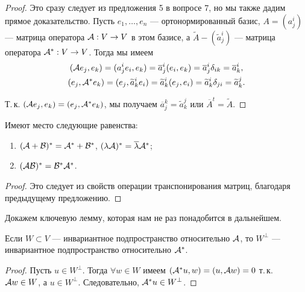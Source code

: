 \begin{proof}
    Это сразу следует из предложения 5 в вопросе 7, но мы также дадим прямое доказательство. Пусть $e_1, \ldots, e_n$ --- ортонормированный базис, $A = (a^i_j)$ --- матрица оператора $\mathcal{A}: V \to V$ в этом базисе, а $\widetilde{A} - (\widetilde{a}^i_j)$ --- матрица оператора $\mathcal{A}^\ast: V \to V$. Тогда мы имеем
    \begin{gather*}
        (\mathcal{A} e_j, e_k) = (a^i_je_i, e_k) = \overline{a}^i_j(e_i, e_k) = \overline{a}^i_j\delta_{ik} = \overline{a}^i_k,\\
        (e_j, \mathcal{A}^\ast e_k) = (e_j, \widetilde{a}^i_ke_i) = \widetilde{a}^i_k(e_j, e_i) = \widetilde{a}^i_k\delta_{ji} = \widetilde{a}^j_k.
    \end{gather*}

    Т.\,к. $(\mathcal{A} e_j, e_k) = (e_j, \mathcal{A}^\ast e_k)$, мы получаем $\overline{a}^k_j = \widetilde{a}^j_k$ или $\overline{A}^t = \widetilde{A}$.
\end{proof}

\begin{proposal}
    Имеют место следующие равенства:
    \begin{enumerate}[nolistsep]
        \item $(\mathcal{A} + \mathcal{B})^\ast = \mathcal{A}^\ast + \mathcal{B}^\ast$, $(\lambda\mathcal{A})^\ast = \overline{\lambda}\mathcal{A}^\ast$;
        \item $(\mathcal{A}\mathcal{B})^\ast = \mathcal{B}^\ast\mathcal{A}^\ast$.
    \end{enumerate}
\end{proposal}

\begin{proof}
    Это следует из свойств операции транспонирования матриц, благодаря предыдущему предложению.
\end{proof}

Докажем ключевую лемму, которая нам не раз понадобится в дальнейшем.

\begin{lemma}[Важная]
    Если $W \subset V$ --- инвариантное подпространство относительно $\mathcal{A}$, то $W^\perp$ --- инвариантное подпространство относительно $\mathcal{A}^\ast$.
\end{lemma}

\begin{proof}
    Пусть $u \in W^\perp$. Тогда $\forall w \in W$ имеем $(\mathcal{A}^\ast u, w) = (u, \mathcal{A} w) = 0$ т.\,к. $\mathcal{A} w \in W$, а $u \in W^\perp$. Следовательно, $\mathcal{A}^\ast u \in W^\perp$.
\end{proof}

